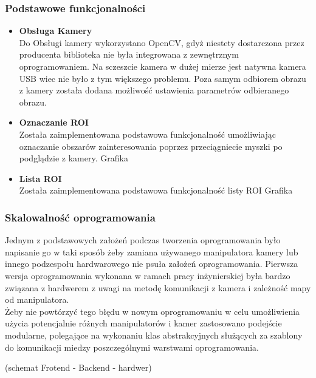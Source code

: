 \documentclass[11pt,a4paper]{article}
\begin{document}
    \subsubsection{Podstawowe funkcjonalności}
    \begin{itemize}
        \item \textbf{Obsługa Kamery} \\ Do Obsługi kamery wykorzystano OpenCV, gdyż niestety dostarczona przez producenta biblioteka nie była integrowana z zewnętrznym oprogramowaniem. Na sczeszcie kamera w dużej mierze jest natywna kamera USB wiec nie było z tym większego problemu. Poza samym odbiorem obrazu z kamery została dodana możliwość ustawienia parametrów odbieranego obrazu.
        \item \textbf{Oznaczanie ROI} \\ Została zaimplementowana podstawowa funkcjonalność umożliwiając oznaczanie obszarów zainteresowania poprzez przeciągniecie myszki po podglądzie z kamery.
            {\color{red}
        Grafika}
        \item \textbf{Lista ROI} \\ Została zaimplementowana podstawowa funkcjonalność listy ROI
            {\color{red}
        Grafika}
    \end{itemize}

    \subsubsection{Skalowalność oprogramowania}

    \hspace{1cm} Jednym z podstawowych założeń podczas tworzenia oprogramowania było napisanie go w taki sposób żeby zamiana używanego manipulatora kamery lub innego podzespołu hardwarowego nie psuła założeń oprogramowania. Pierwsza wersja oprogramowania wykonana w ramach pracy inżynierskiej była bardzo związana z hardwerem z uwagi na metodę komunikacji z kamera i zależność mapy od manipulatora.\\

    \hspace{1cm} Żeby nie powtórzyć tego błędu w nowym oprogramowaniu w celu umożliwienia użycia potencjalnie różnych manipulatorów i kamer zastosowano podejście modularne, polegające na wykonaniu klas abstrakcyjnych służących za szablony do komunikacji miedzy poszczególnymi warstwami oprogramowania.

            {\color{red}
    (schemat Frotend - Backend - hardwer)}
\end{document}
